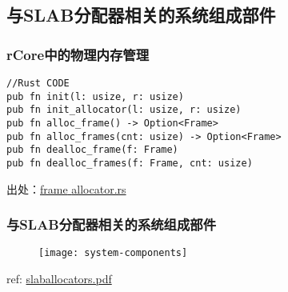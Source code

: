 \subsection{与SLAB分配器相关的系统组成部件} %
\begin{frame}[fragile]   
    \frametitle{rCore中的物理内存管理}

\begin{block}{}
\begin{verbatim}
//Rust CODE
pub fn init(l: usize, r: usize)
pub fn init_allocator(l: usize, r: usize)
pub fn alloc_frame() -> Option<Frame>
pub fn alloc_frames(cnt: usize) -> Option<Frame>
pub fn dealloc_frame(f: Frame)
pub fn dealloc_frames(f: Frame, cnt: usize) 
\end{verbatim}
\end{block}

出处：\href{https://github.com/rcore-os/rCore_tutorial/blob/ch4-pa2/os/src/memory/frame_allocator.rs}{frame\uline{ }allocator.rs}

\end{frame}
\begin{frame}[plain,t]    
    \frametitle{与SLAB分配器相关的系统组成部件}
    \begin{figure}
        \centering
        \texttt{[image: system-components]}
    \end{figure}

    ref: \href{https://events.static.linuxfound.org/sites/events/files/slides/slaballocators.pdf}{slaballocators.pdf}

\end{frame}
